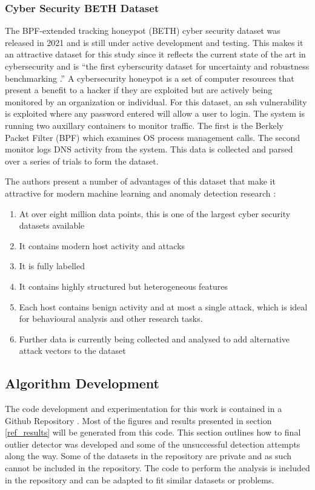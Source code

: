 \subsubsection{Cyber Security BETH Dataset}

The BPF-extended tracking honeypot (BETH) cyber security dataset was released in 2021 and is still under active development and testing. This makes it an attractive dataset for this study since it reflects the current state of the art in cybersecurity and is ``the first cyberscurity dataset for uncertainty and robustness benchmarking \cite{beth-dataset}.'' A cybersecurity honeypot is a set of computer resources that present a benefit to a hacker if they are exploited but are actively being monitored by an organization or individual. For this dataset, an ssh vulnerability is exploited where any password entered will allow a user to login. The system is running two auxillary containers to monitor traffic. The first is the Berkely Packet Filter (BPF) which examines OS process management calls. The second monitor logs DNS activity from the system. This data is collected and parsed over a series of trials to form the dataset.

The authors present a number of advantages of this dataset that make it attractive for modern machine learning and anomaly detection research \cite{beth-dataset}:

\begin{enumerate}
    \item At over eight million data points, this is one of the largest cyber security datasets available
    \item It contains modern host activity and attacks
    \item It is fully labelled
    \item It contains highly structured but heterogeneous features 
    \item Each host contains benign activity and at most a single attack, which is ideal for behavioural analysis and other research tasks.
    \item Further data is currently being collected and analysed to add alternative attack vectors to the dataset
\end{enumerate}


\subsection{Algorithm Development}

The code development and experimentation for this work is contained in a Github Repository \cite{BeattieGithub2022}. Most of the figures and results presented in section \ref{ref_results} will be generated from this code. This section outlines how to final outlier detector was developed and some of the unsuccessful detection attempts along the way. Some of the datasets in the repository are private and as such cannot be included in the repository. The code to perform the analysis is included in the repository and can be adapted to fit similar datasets or problems.

